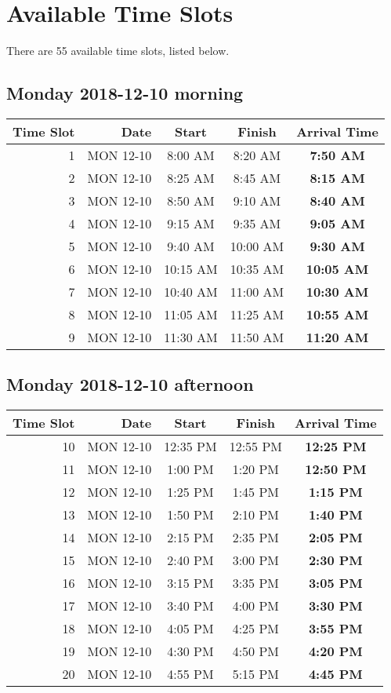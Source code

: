 \documentclass[]{book}
\theoremstyle{definition}
\theoremstyle{definition}
\theoremstyle{definition}
\theoremstyle{remark}
\begin{document}
\hypertarget{available-time-slots}{%
\section{Available Time Slots}\label{available-time-slots}}

There are 55 available time slots, listed below.

\hypertarget{monday-2018-12-10-morning}{%
\subsection{Monday 2018-12-10 morning}\label{monday-2018-12-10-morning}}

\begin{longtable}[]{@{}rrccc@{}}
\toprule
Time Slot & Date & Start & Finish & \textbf{Arrival Time}\tabularnewline
\midrule
\endhead
1 & MON 12-10 & 8:00 AM & 8:20 AM & \textbf{7:50 AM}\tabularnewline
2 & MON 12-10 & 8:25 AM & 8:45 AM & \textbf{8:15 AM}\tabularnewline
3 & MON 12-10 & 8:50 AM & 9:10 AM & \textbf{8:40 AM}\tabularnewline
4 & MON 12-10 & 9:15 AM & 9:35 AM & \textbf{9:05 AM}\tabularnewline
5 & MON 12-10 & 9:40 AM & 10:00 AM & \textbf{9:30 AM}\tabularnewline
6 & MON 12-10 & 10:15 AM & 10:35 AM & \textbf{10:05 AM}\tabularnewline
7 & MON 12-10 & 10:40 AM & 11:00 AM & \textbf{10:30 AM}\tabularnewline
8 & MON 12-10 & 11:05 AM & 11:25 AM & \textbf{10:55 AM}\tabularnewline
9 & MON 12-10 & 11:30 AM & 11:50 AM & \textbf{11:20 AM}\tabularnewline
\bottomrule
\end{longtable}

\hypertarget{monday-2018-12-10-afternoon}{%
\subsection{Monday 2018-12-10
afternoon}\label{monday-2018-12-10-afternoon}}

\begin{longtable}[]{@{}rrccc@{}}
\toprule
Time Slot & Date & Start & Finish & \textbf{Arrival Time}\tabularnewline
\midrule
\endhead
10 & MON 12-10 & 12:35 PM & 12:55 PM & \textbf{12:25 PM}\tabularnewline
11 & MON 12-10 & 1:00 PM & 1:20 PM & \textbf{12:50 PM}\tabularnewline
12 & MON 12-10 & 1:25 PM & 1:45 PM & \textbf{1:15 PM}\tabularnewline
13 & MON 12-10 & 1:50 PM & 2:10 PM & \textbf{1:40 PM}\tabularnewline
14 & MON 12-10 & 2:15 PM & 2:35 PM & \textbf{2:05 PM}\tabularnewline
15 & MON 12-10 & 2:40 PM & 3:00 PM & \textbf{2:30 PM}\tabularnewline
16 & MON 12-10 & 3:15 PM & 3:35 PM & \textbf{3:05 PM}\tabularnewline
17 & MON 12-10 & 3:40 PM & 4:00 PM & \textbf{3:30 PM}\tabularnewline
18 & MON 12-10 & 4:05 PM & 4:25 PM & \textbf{3:55 PM}\tabularnewline
19 & MON 12-10 & 4:30 PM & 4:50 PM & \textbf{4:20 PM}\tabularnewline
20 & MON 12-10 & 4:55 PM & 5:15 PM & \textbf{4:45 PM}\tabularnewline
\bottomrule
\end{longtable}
\end{document}
